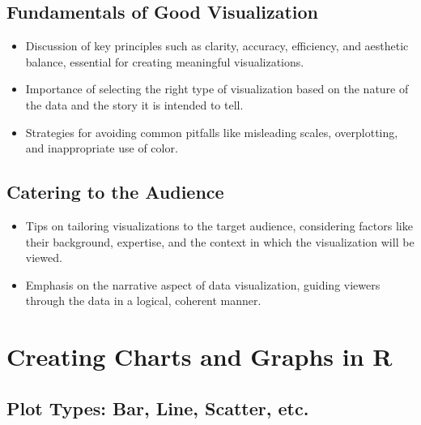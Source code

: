 \documentclass[
]{book}
\begin{document}
\hypertarget{fundamentals-of-good-visualization}{%
\subsection*{Fundamentals of Good Visualization}\label{fundamentals-of-good-visualization}}

\begin{itemize}
\item
  Discussion of key principles such as clarity, accuracy, efficiency, and aesthetic balance, essential for creating meaningful visualizations.
\item
  Importance of selecting the right type of visualization based on the nature of the data and the story it is intended to tell.
\item
  Strategies for avoiding common pitfalls like misleading scales, overplotting, and inappropriate use of color.
\end{itemize}

\hypertarget{catering-to-the-audience}{%
\subsection*{Catering to the Audience}\label{catering-to-the-audience}}

\begin{itemize}
\item
  Tips on tailoring visualizations to the target audience, considering factors like their background, expertise, and the context in which the visualization will be viewed.
\item
  Emphasis on the narrative aspect of data visualization, guiding viewers through the data in a logical, coherent manner.
\end{itemize}

\hypertarget{creating-charts-and-graphs-in-r}{%
\section*{Creating Charts and Graphs in R}\label{creating-charts-and-graphs-in-r}}

\hypertarget{plot-types-bar-line-scatter-etc.}{%
\subsection*{Plot Types: Bar, Line, Scatter, etc.}\label{plot-types-bar-line-scatter-etc.}}
\end{document}
